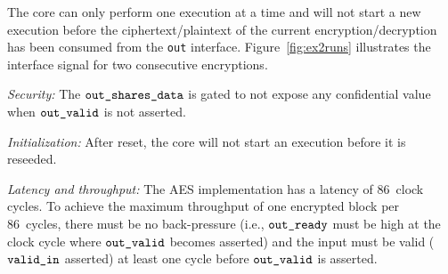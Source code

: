 \documentclass{scrartcl}
\begin{document}
The core can only perform one execution at a time and will not start a new
execution before the ciphertext/plaintext of the current encryption/decryption has been consumed from
the \texttt{out} interface.
Figure~\ref{fig:ex2runs} illustrates the interface signal for two consecutive encryptions.

\emph{Security:}
The $\texttt{out\_shares\_data}$ is gated to not expose any confidential value when
$\texttt{out\_valid}$ is not asserted.

\emph{Initialization:}
After reset, the core will not start an execution before it is reseeded.

\emph{Latency and throughput:}
The AES implementation has a latency of 86~clock cycles. To achieve the
maximum throughput of one encrypted block per 86~cycles, there must be no
back-pressure (i.e., $\texttt{out\_ready}$ must be high at the clock cycle where
$\texttt{out\_valid}$ becomes asserted) and the input must be valid
($\texttt{valid\_in}$ asserted) at least one cycle before $\texttt{out\_valid}$ is
asserted.
\end{document}
